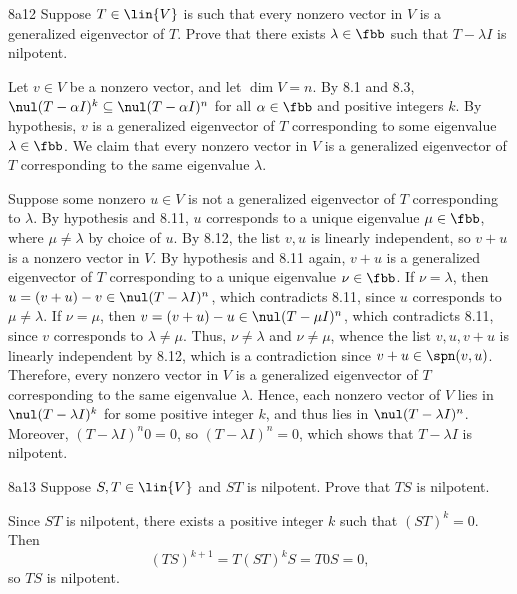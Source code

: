 \begin{exercise}{8a12}
    Suppose $T \in \lin{V}$ is such that every nonzero vector in $V$ is a generalized eigenvector of $T$.
    Prove that there exists $\lambda \in \fbb$ such that $T - \lambda I$ is nilpotent.
\end{exercise}

\begin{sol}
    Let $v \in V$ be a nonzero vector, and let $\dim V = n$.
    By 8.1 and 8.3, $\nul(T - \alpha I)^k \subseteq \nul(T - \alpha I)^n$ for all $\alpha \in \fbb$ and positive integers $k$.
    By hypothesis, $v$ is a generalized eigenvector of $T$ corresponding to some eigenvalue $\lambda \in \fbb$.
    We claim that every nonzero vector in $V$ is a generalized eigenvector of $T$ corresponding to the same eigenvalue $\lambda$.

    Suppose some nonzero $u \in V$ is not a generalized eigenvector of $T$ corresponding to $\lambda$.
    By hypothesis and 8.11, $u$ corresponds to a unique eigenvalue $\mu \in \fbb$, where $\mu \neq \lambda$ by choice of $u$.
    By 8.12, the list $v, u$ is linearly independent, so $v + u$ is a nonzero vector in $V$.
    By hypothesis and 8.11 again, $v + u$ is a generalized eigenvector of $T$ corresponding to a unique eigenvalue $\nu \in \fbb$.
    If $\nu = \lambda$, then $u = (v + u) - v \in \nul(T - \lambda I)^n$, which contradicts 8.11, since $u$ corresponds to $\mu \neq \lambda$.
    If $\nu = \mu$, then $v = (v + u) - u \in \nul(T - \mu I)^n$, which contradicts 8.11, since $v$ corresponds to $\lambda \neq \mu$.
    Thus, $\nu \neq \lambda$ and $\nu \neq \mu$, whence the list $v, u, v + u$ is linearly independent by 8.12, which is a contradiction since $v + u \in \spn(v, u)$.
    Therefore, every nonzero vector in $V$ is a generalized eigenvector of $T$ corresponding to the same eigenvalue $\lambda$.
    Hence, each nonzero vector of $V$ lies in $\nul(T - \lambda I)^k$ for some positive integer $k$, and thus lies in $\nul(T - \lambda I)^n$.
    Moreover, $(T - \lambda I)^n 0 = 0$, so $(T - \lambda I)^n = 0$, which shows that $T - \lambda I$ is nilpotent.
\end{sol}

\begin{exercise}{8a13}
    Suppose $S, T \in \lin{V}$ and $ST$ is nilpotent.
    Prove that $TS$ is nilpotent.
\end{exercise}

\begin{sol}
    Since $ST$ is nilpotent, there exists a positive integer $k$ such that $(ST)^k = 0$.
    Then
    \[
        (TS)^{k+1} = T(ST)^k S = T 0 S = 0,
    \]
    so $TS$ is nilpotent.
\end{sol}

